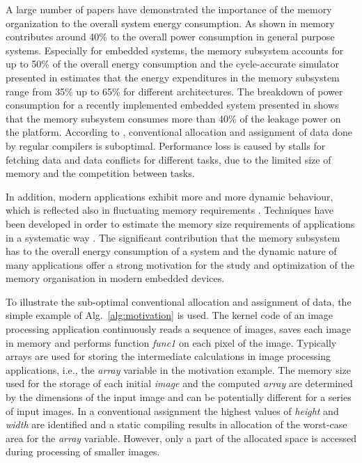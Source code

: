 \documentclass[smallextended]{svjour3}
\begin{document}
A large number of papers have demonstrated the importance of the memory organization to the overall system energy consumption. 
As shown in \cite{Gonzalez1996} memory contributes around 40\% to the overall power consumption in general purpose systems. 
Especially for embedded systems, the memory subsystem accounts for up to 50\% of the overall energy consumption \cite{Che09} and the cycle-accurate simulator presented in \cite{Ben99} estimates that the energy expenditures in the memory subsystem range from 35\% up to 65\% for different architectures. 
The breakdown of power consumption for a recently implemented embedded system presented in \cite{Hul11} shows that the memory subsystem consumes more than 40\% of the leakage power on the platform. 
According to \cite{tcm}, conventional allocation and assignment of data done by regular compilers is suboptimal. 
Performance loss is caused by stalls for fetching data and data conflicts for different tasks, due to the limited size of memory and the competition between tasks. 

In addition, modern applications exhibit more and more dynamic behaviour, which is reflected also in fluctuating memory requirements \cite{tcm}. 
Techniques have been developed in order to estimate the memory size requirements of applications in a systematic way \cite{Ang13}. 
The significant contribution that the memory subsystem has to the overall energy consumption of a system and the dynamic nature of many applications offer a strong motivation for the study and optimization of the memory organisation in modern embedded devices.

To illustrate the sub-optimal conventional allocation and assignment of data, the simple example of Alg.~\ref{alg:motivation} is used. 
The kernel code of an image processing application continuously reads a sequence of images, saves each image in memory and performs function \textit{func1} on each pixel of the image. 
Typically arrays are used for storing the intermediate calculations in image processing applications, i.e., the \textit{array} variable in the motivation example. 
The memory size used for the storage of each initial \textit{image} and the computed \textit{array} are determined by the dimensions of the input image and can be potentially different for a series of input images. 
In a conventional assignment the highest values of \textit{height} and \textit{width} are identified and a static compiling results in allocation of the worst-case area for the \textit{array} variable. 
However, only a part of the allocated space is accessed during processing of smaller images. 
\end{document}
